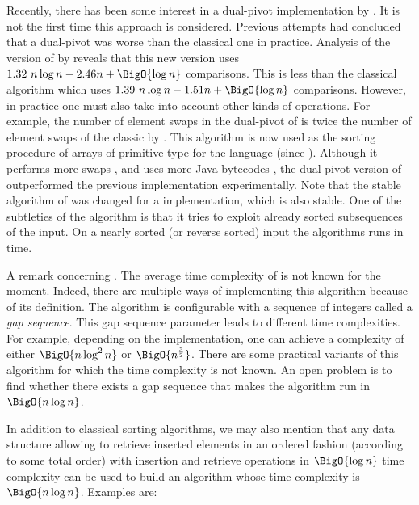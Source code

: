 Recently, there has been some interest in a dual-pivot \quicksort
implementation by \citet*{yaroslavskiy:2009}. It is not the first time this
approach is considered. Previous attempts \cite{sedgewick:1980} had concluded
that a dual-pivot \quicksort was worse than the classical one in practice.
Analysis of the version of \citet*{yaroslavskiy:2009} by \citet*{wild:2012}
reveals that this new version uses \(1.32~n \log n - 2.46n + \BigO{\log n}\)
comparisons.  This is less than the classical \quicksort algorithm which uses
\(1.39~n \log n
- 1.51n + \BigO{\log n}\) comparisons. However, in practice one must also take into account
  other kinds of operations. For example, the number of element swaps in the
dual-pivot \quicksort of \citeauthor{yaroslavskiy:2009} is twice the number of
element swaps of the classic \quicksort by \citeauthor{hoare:1962}. This
algorithm is now used as the sorting procedure of arrays of primitive type for
the \Java language (since ). Although it performs more
swaps \cite{wild:2012}, and uses more Java bytecodes \cite{wild:2013}, the
dual-pivot version of \citet*{yaroslavskiy:2009} outperformed the previous
\quicksort implementation experimentally. Note that the stable \mergesort
algorithm of  was changed for a \timsort implementation, which is
also stable. One of the subtleties of the \timsort algorithm is that it tries
to exploit already sorted subsequences of the input. On a nearly sorted (or
reverse sorted) input the \timsort algorithms runs in  time.

A remark concerning \shellsort. The average time complexity of \shellsort is not
known for the moment. Indeed, there are multiple ways of implementing this
algorithm because of its definition. The \shellsort algorithm is configurable
with a sequence of integers called a \emph{gap sequence}. This gap sequence
parameter leads to different time complexities. For example, depending on the
implementation, one can achieve a complexity of either $\BigO{n \log^2 n}$ or
$\BigO{n^{\frac{3}{2}}}$. There are some practical variants of this algorithm
for which the time complexity is not known. An open problem is to find whether
there exists a gap sequence that makes the algorithm run in $\BigO{n \log
n}$.

In addition to classical sorting algorithms, we may also mention that any data
structure allowing to retrieve inserted elements in an ordered fashion
(according to some total order) with insertion and retrieve operations in
$\BigO{\log n}$ time complexity can be used to build an algorithm whose time
complexity is $\BigO{n \log n}$. Examples are:

